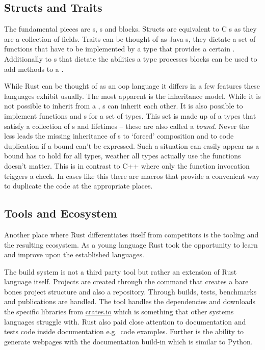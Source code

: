 \documentclass[thesis]{subfiles}
\begin{document}
  \subsection{Structs and Traits}
    The fundamental pieces are s, s and  blocks.
    Structs are equivalent to C s as they are a collection of fields.
    Traits can be thought of as Java s, they dictate a set of functions that have to be implemented by a type that provides a certain .
    Additionally to s that dictate the abilities a type processes  blocks can be used to add methods to a .


    While Rust can be thought of as an \gls{oop} language it differs in a few features these languages exhibit usually.
    The most apparent is the inheritance model.
    While it is not possible to inherit from a , s can inherit each other.
    It is also possible to implement functions and s for a set of types.
    This set is made up of a types that satisfy a collection of s and lifetimes -- these are also called a \emph{bound}.
    Never the less leads the missing inheritance of s to `forced' composition and to code duplication if a bound can't be expressed.
    Such a situation can easily appear as a bound has to hold for all types, weather all types actually use the functions doesn't matter.
    This is in contrast to C++ where only the function invocation triggers a check.
    In cases like this there are macros that provide a convenient way to duplicate the code at the appropriate places.


  \subsection{Tools and Ecosystem}
    Another place where Rust differentiates itself from competitors is the tooling and the resulting ecosystem.
    As a young language Rust took the opportunity to learn and improve upon the established languages.

    The build system is not a third party tool but rather an extension of Rust language itself.
    Projects are created through the  command that creates a bare bones project structure and also a  repository.
    Through  builds, tests, benchmarks and publications are handled.
    The tool handles the dependencies and downloads the specific libraries from \href{www.crates.io}{crates.io} which is something that other systems languages struggle with.
    Rust also paid close attention to documentation and tests code inside documentation e.g.\ code examples.
    Further is the ability to generate webpages with the documentation build-in which is similar to Python.
\end{document}
